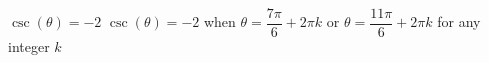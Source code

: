 {$\csc(\theta) = -2$}
{$\csc(\theta) = -2$ when $\theta = \dfrac{7\pi}{6} + 2\pi k$ or $\theta = \dfrac{11\pi}{6} + 2\pi k$ for any integer $k$}
